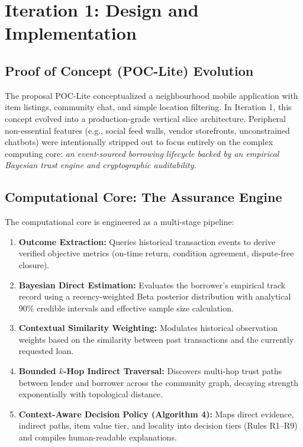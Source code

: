 \chapter{Iteration 1: Design and Implementation}

\section{Proof of Concept (POC-Lite) Evolution}
The proposal POC-Lite conceptualized a neighbourhood mobile application with item listings, community chat, and simple location filtering. In Iteration 1, this concept evolved into a production-grade vertical slice architecture. Peripheral non-essential features (e.g., social feed walls, vendor storefronts, unconstrained chatbots) were intentionally stripped out to focus entirely on the complex computing core: \textit{an event-sourced borrowing lifecycle backed by an empirical Bayesian trust engine and cryptographic auditability.}

\section{Computational Core: The Assurance Engine}
The computational core is engineered as a multi-stage pipeline:
\begin{enumerate}
    \item \textbf{Outcome Extraction:} Queries historical transaction events to derive verified objective metrics (on-time return, condition agreement, dispute-free closure).
    \item \textbf{Bayesian Direct Estimation:} Evaluates the borrower's empirical track record using a recency-weighted Beta posterior distribution with analytical 90\% credible intervals and effective sample size calculation.
    \item \textbf{Contextual Similarity Weighting:} Modulates historical observation weights based on the similarity between past transactions and the currently requested loan.
    \item \textbf{Bounded $k$-Hop Indirect Traversal:} Discovers multi-hop trust paths between lender and borrower across the community graph, decaying strength exponentially with topological distance.
    \item \textbf{Context-Aware Decision Policy (Algorithm 4):} Maps direct evidence, indirect paths, item value tier, and locality into decision tiers (Rules R1--R9) and compiles human-readable explanations.
\end{enumerate}

